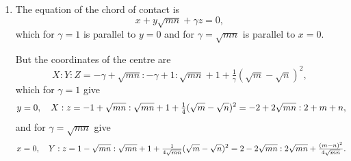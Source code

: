 \documentclass[12pt,a4paper]{article}
\theoremstyle{plain}
\theoremstyle{definition}
\theoremstyle{remark}
\begin{document}
\begin{enumerate}[label=\arabic*.]
Now writing $X$, $Y$, $Q$ in the place of $x$, $y$, $z$; $k' = 1$, and $\alpha = \{1 + \sqrt{mn}\}$, $\beta = 2$, $\gamma = (\sqrt{m} - \sqrt{n})^2$, we have
\begin{multline*}
-16[\{1 + \sqrt{mn}\}^2 + 8(\sqrt{m} - \sqrt{n})^2](ZQ + X^2) \\
= [4\{1 + \sqrt{mn}\}Z + 8Y - (4(\sqrt{m} - \sqrt{n})^2 + \{1 + \sqrt{mn}\}^2)Q]^2 \\
- [\{1 + \sqrt{mn}\}^2 + 8(\sqrt{m} - \sqrt{n})^2][4X - \{1 + \sqrt{mn}\}Q]^2 \\
- 16[\{1 + \sqrt{mn}\}X + 2Y + (\sqrt{m} - \sqrt{n})^2 Q]^2,
\end{multline*}
and the asymptotes are
\begin{multline*}
4\{1 + \sqrt{mn}\}Z + 8Y - [4(\sqrt{m} - \sqrt{n})^2 + \{1 + \sqrt{mn}\}^2]Q \\
= \pm\sqrt{\{1 + \sqrt{mn}\}^2 + 8(\sqrt{m} - \sqrt{n})^2}\,[4X - \{1 + \sqrt{mn}\}Q].
\end{multline*}

At the centre
\[4\{1 + \sqrt{mn}\}Z + 8Y - [4(\sqrt{m} - \sqrt{n})^2 + \{1 + \sqrt{mn}\}^2]Q = 0,\]
\[4X - \{1 + \sqrt{mn}\}Q = 0,\]
but the first equation is
\[\{1 + \sqrt{mn}\}[4Z - Q\{1 + \sqrt{mn}\}] + 8Y - 4(\sqrt{m} - \sqrt{n})^2 Q = 0,\]
so that we have
\[4Z = \{1 + \sqrt{mn}\}Q, \quad 2Y = (\sqrt{m} - \sqrt{n})^2 Q,\]
the first of these is
\[2(\sqrt{m} - \sqrt{n})^2(x - y) - \{1 + \sqrt{mn}\}^2(x - y) - (1 - mn)z = 0,\]
and the two together give
\[2Z(\sqrt{m} - \sqrt{n})^2 - \{1 + \sqrt{mn}\}Y = 0,\]
so that we have
\begin{align*}
2(\sqrt{m} - \sqrt{n})^2(x - y) - \{1 + \sqrt{mn}\}\{x - y\sqrt{mn}\} &= 0, \\
[\{1 + \sqrt{mn}\}^2 - 2(\sqrt{m} - \sqrt{n})^2](x - y) + (1 - mn)z &= 0,
\end{align*}
to determine the coordinates of the centre.

\item The equation of the chord of contact is
\[x + y\sqrt{mn} + \gamma z = 0,\]
which for $\gamma = 1$ is parallel to $y = 0$ and for $\gamma = \sqrt{mn}$ is parallel to $x = 0$.

But the coordinates of the centre are
\[X : Y : Z = -\gamma + \sqrt{mn} : -\gamma + 1 : \sqrt{mn} + 1 + \tfrac{1}{\gamma}(\sqrt{m} - \sqrt{n})^2,\]
which for $\gamma = 1$ give
\[
\resizebox{\textwidth}{!}{$\displaystyle y = 0, \quad X : z = -1 + \sqrt{mn} : \sqrt{mn} + 1 + \tfrac{1}{4}(\sqrt{m} - \sqrt{n})^2 = -2 + 2\sqrt{mn} : 2 + m + n, $}
\]
and for $\gamma = \sqrt{mn}$ give
\[
\resizebox{\textwidth}{!}{$\displaystyle x = 0, \quad Y : z = 1 - \sqrt{mn} : \sqrt{mn} + 1 + \tfrac{1}{4\sqrt{mn}}(\sqrt{m} - \sqrt{n})^2 = 2 - 2\sqrt{mn} : 2\sqrt{mn} + \tfrac{(m - n)^2}{4\sqrt{mn}}. $}
\]


\end{enumerate}
\end{document}
